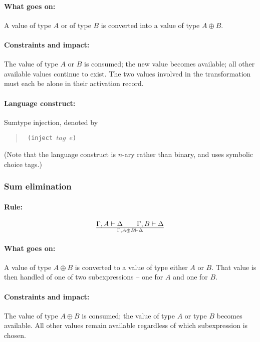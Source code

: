 \documentclass[a4paper]{article}
\begin{document}
\paragraph{What goes on:} A value of type $A$ or of type $B$ is
converted into a value of type $A \oplus B$.

\paragraph{Constraints and impact:} The value of type $A$ or $B$ is
consumed; the new value becomes available; all other available values
continue to exist.
The two values involved in the transformation must each be alone in
their activation record.

\paragraph{Language construct:} Sumtype injection, denoted by
\begin{quote}\tt
  (inject $\mathit{tag}$ $e$)
\end{quote}
(Note that the language construct is $n$-ary rather than binary, and
uses symbolic choice tags.)


\subsubsection{Sum elimination}
\paragraph{Rule:}
$$
{
  \Gamma,A \vdash \Delta \qquad \Gamma,B \vdash \Delta
}\over{
  \Gamma, A\oplus B \vdash \Delta
}
$$

\paragraph{What goes on:} A value of type $A \oplus B$ is converted to
a value of type either $A$ or $B$. That value is then handled of one
of two subexpressions -- one for $A$ and one for $B$.

\paragraph{Constraints and impact:} The value of type $A \oplus B$ is
consumed; the value of type $A$ or type $B$ becomes available.
All other values remain available regardless of which subexpression is chosen.
\end{document}
